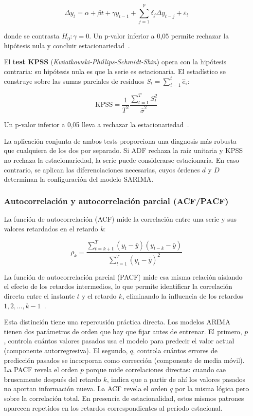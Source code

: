\documentclass[12pt, a4paper]{article}
\begin{document}
\begin{equation}
\Delta y_t = \alpha + \beta t + \gamma y_{t-1} + \sum_{j=1}^{p} \delta_j \Delta y_{t-j} + \varepsilon_t
\end{equation}

donde se contrasta $H_0: \gamma = 0$. Un p-valor inferior a 0{,}05 permite rechazar la hipótesis nula y concluir estacionariedad~\cite{hyndman2021}.

El \textbf{test KPSS} (\textit{Kwiatkowski-Phillips-Schmidt-Shin}) opera con la hipótesis contraria: su hipótesis nula es que la serie es estacionaria. El estadístico se construye sobre las sumas parciales de residuos $S_t = \sum_{i=1}^{t} \hat{e}_i$:

\begin{equation}
\text{KPSS} = \frac{1}{T^2} \frac{\sum_{t=1}^{T} S_t^2}{\hat{\sigma}^2}
\end{equation}

Un p-valor inferior a 0{,}05 lleva a rechazar la estacionariedad~\cite{hyndman2021}.

La aplicación conjunta de ambos tests proporciona una diagnosis más robusta que cualquiera de los dos por separado. Si ADF rechaza la raíz unitaria y KPSS no rechaza la estacionariedad, la serie puede considerarse estacionaria. En caso contrario, se aplican las diferenciaciones necesarias, cuyos órdenes $d$ y $D$ determinan la configuración del modelo SARIMA.

\subsubsection{Autocorrelación y autocorrelación parcial (ACF/PACF)}

La función de autocorrelación (ACF) mide la correlación entre una serie y sus valores retardados en el retardo $k$:

\begin{equation}
\rho_k = \frac{\sum_{t=k+1}^{T}(y_t - \bar{y})(y_{t-k} - \bar{y})}{\sum_{t=1}^{T}(y_t - \bar{y})^2}
\end{equation}

La función de autocorrelación parcial (PACF) mide esa misma relación aislando el efecto de los retardos intermedios, lo que permite identificar la correlación directa entre el instante $t$ y el retardo $k$, eliminando la influencia de los retardos $1, 2, \ldots, k-1$~\cite{hyndman2021}.

Esta distinción tiene una repercusión práctica directa. Los modelos ARIMA tienen dos parámetros de orden que hay que fijar antes de entrenar. El primero, $p$, controla cuántos valores pasados usa el modelo para predecir el valor actual (componente autorregresiva). El segundo, $q$, controla cuántos errores de predicción pasados se incorporan como corrección (componente de media móvil). La PACF revela el orden $p$ porque mide correlaciones directas: cuando cae bruscamente después del retardo $k$, indica que a partir de ahí los valores pasados no aportan información nueva. La ACF revela el orden $q$ por la misma lógica pero sobre la correlación total. En presencia de estacionalidad, estos mismos patrones aparecen repetidos en los retardos correspondientes al período estacional.
\end{document}
